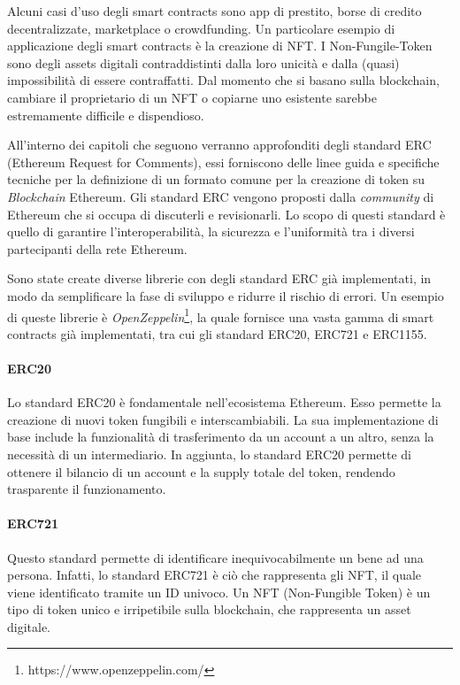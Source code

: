 Alcuni casi d'uso degli smart contracts sono app di prestito, borse di credito decentralizzate, marketplace o crowdfunding.
Un particolare esempio di applicazione degli smart contracts è la creazione di NFT.
I Non-Fungile-Token sono degli assets digitali contraddistinti dalla loro unicità e dalla (quasi) impossibilità di essere contraffatti.
Dal momento che si basano sulla blockchain, cambiare il proprietario di un NFT o copiarne uno esistente sarebbe estremamente difficile e dispendioso. \cite{smart-contracts}

All'interno dei capitoli che seguono verranno approfonditi degli standard ERC (Ethereum Request for Comments), essi forniscono delle linee guida e specifiche tecniche per la definizione di un formato comune per la creazione di token su \textit{Blockchain} Ethereum. Gli standard ERC vengono proposti dalla \textit{community} di Ethereum che si occupa di discuterli e revisionarli. Lo scopo di questi standard è quello di garantire l'interoperabilità, la sicurezza e l'uniformità tra i diversi partecipanti della rete Ethereum. \cite{erc}

Sono state create diverse librerie con degli standard ERC già implementati, in modo da semplificare la fase di sviluppo e ridurre il rischio di errori. Un esempio di queste librerie è \textit{OpenZeppelin}\footnote{https://www.openzeppelin.com/}, la quale fornisce una vasta gamma di smart contracts già implementati, tra cui gli standard ERC20, ERC721 e ERC1155. \cite{ethereum-smart-contracts-library}

\paragraph{ERC20}
Lo standard ERC20 è fondamentale nell'ecosistema Ethereum. Esso permette la creazione di nuovi token fungibili e interscambiabili. La sua implementazione di base include la funzionalità di trasferimento da un account a un altro, senza la necessità di un intermediario. In aggiunta, lo standard ERC20 permette di ottenere il bilancio di un account e la supply totale del token, rendendo trasparente il funzionamento. \cite{erc20}


\paragraph{ERC721}
\label{sec:erc721}
Questo standard permette di identificare inequivocabilmente un bene ad una persona.
Infatti, lo standard ERC721 è ciò che rappresenta gli NFT, il quale viene identificato tramite un ID univoco.
Un NFT (Non-Fungible Token) è un tipo di token unico e irripetibile sulla blockchain, che rappresenta un asset digitale. 

